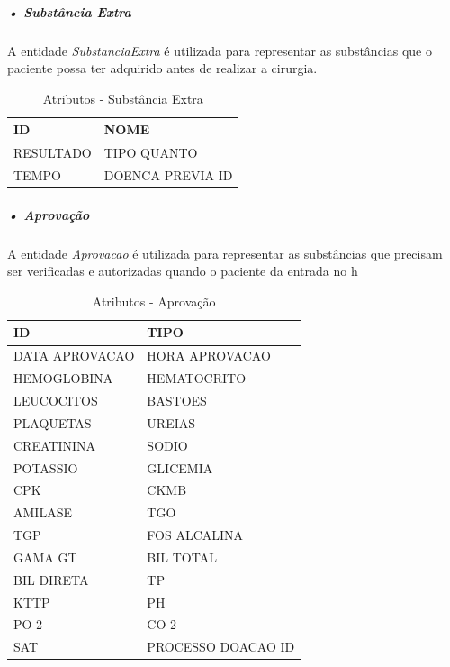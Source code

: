 \documentclass[portuguese,oneside]{tcc}
\begin{document}
\subparagraph{• Substância Extra}
A entidade \textit{SubstanciaExtra} é utilizada para representar as substâncias que o paciente possa ter adquirido antes de realizar a cirurgia.

\begin{table}
\centering
\caption{Atributos - Substância Extra} \label{table:substancia-extra}
\begin{tabular}{ |p{6cm}|p{6cm}| }

\hline
ID & NOME\\
\hline
RESULTADO & TIPO QUANTO\\
\hline
TEMPO & DOENCA PREVIA ID\\
\hline

\end{tabular}
\end{table}

\newpage

\subparagraph{• Aprovação}
A entidade \textit{Aprovacao} é utilizada para representar as substâncias que precisam ser verificadas e autorizadas quando o paciente da entrada no h

\begin{table}
\centering
\caption{Atributos - Aprovação} \label{table:atr-aprovacao}
\begin{tabular}{ |p{6cm}|p{6cm}| }

\hline
ID & TIPO\\
\hline
DATA APROVACAO & HORA APROVACAO\\
\hline
HEMOGLOBINA & HEMATOCRITO\\
\hline
LEUCOCITOS & BASTOES \\
\hline
PLAQUETAS & UREIAS\\
\hline
CREATININA & SODIO\\
\hline
POTASSIO & GLICEMIA\\
\hline
CPK & CKMB\\
\hline
AMILASE & TGO\\
\hline
TGP & FOS ALCALINA\\
\hline
GAMA GT & BIL TOTAL\\
\hline
BIL DIRETA & TP\\
\hline
KTTP & PH\\
\hline
PO 2 & CO 2\\
\hline
SAT & PROCESSO DOACAO ID\\
\hline

\end{tabular}
\end{table}
\end{document}
